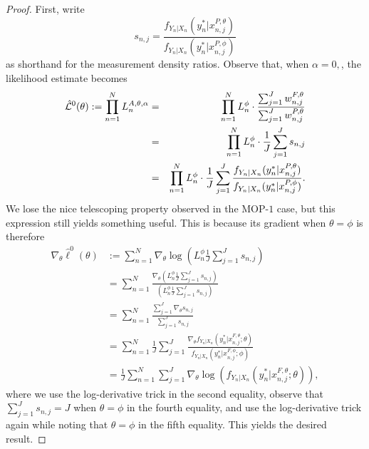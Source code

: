 \begin{proof}
First, write $$s_{n,j} = \frac{f_{Y_n|X_n}(y_n^*|x_{n,j}^{P, \theta})}{f_{Y_n|X_n}(y_n^*|x_{n,j}^{P, \phi})}$$
as shorthand for the measurement density ratios. 
Observe that, when $\alpha=0,$, the likelihood estimate becomes
\begin{eqnarray}
    \hat{\mathcal{L}}^0(\theta) := \prod_{n=1}^N L_n^{A, \theta, \alpha} &=& \prod_{n=1}^N L_n^\phi \cdot \frac{\sum_{j=1}^J w_{n,j}^{F,\theta}}{\sum_{j=1}^J w_{n,j}^{P,\theta}} 
    \\
    &=& \prod_{n=1}^N L_n^\phi \cdot \frac{1}{J}\sum_{j=1}^J s_{n,j} 
    \\
    &=& \prod_{n=1}^N L_n^\phi \cdot \frac{1}{J}\sum_{j=1}^J \frac{f_{Y_n|X_n}(y_n^*|x_{n,j}^{P, \theta})}{f_{Y_n|X_n}(y_n^*|x_{n,j}^{P, \phi})}.
\end{eqnarray}
We lose the nice telescoping property observed in the MOP-$1$ case, but this expression still yields something useful. 
This is because its gradient when $\theta=\phi$ is therefore 
\begin{align}
    \nabla_\theta \hat{\ell}^0(\theta) &:= \sum_{n=1}^N \nabla_\theta \log\left(L_n^\phi \frac{1}{J} \sum_{j=1}^J s_{n,j}\right) \\
    &= \sum_{n=1}^N \frac{\nabla_\theta \left(L_n^\phi \frac{1}{J} \sum_{j=1}^J s_{n,j}\right)}{\left(L_n^\phi \frac{1}{J} \sum_{j=1}^J s_{n,j}\right)} \\
    &= \sum_{n=1}^N \frac{\sum_{j=1}^J \nabla_\theta s_{n,j}}{\sum_{j=1}^J s_{n,j}} \\
    &= \sum_{n=1}^N \frac{1}{J} \sum_{j=1}^J \frac{\nabla_\theta f_{Y_n|X_{n}}(y_n^*|x_{n,j}^{F, \theta}; \theta)}{f_{Y_n|X_{n}}(y_n^*|x_{n,j}^{F, \phi}; \phi)} \\
    &= \frac{1}{J} \sum_{n=1}^N \sum_{j=1}^J \nabla_\theta \log\left(f_{Y_n|X_{n}}(y_n^*|x_{n,j}^{F, \theta}; \theta)\right),
\end{align}
where we use the log-derivative trick in the second equality, observe that $\sum_{j=1}^J s_{n,j} = J$ when $\theta=\phi$ in the fourth equality, and use the log-derivative trick again while noting that $\theta=\phi$ in the fifth equality. This yields the desired result.
\end{proof}




